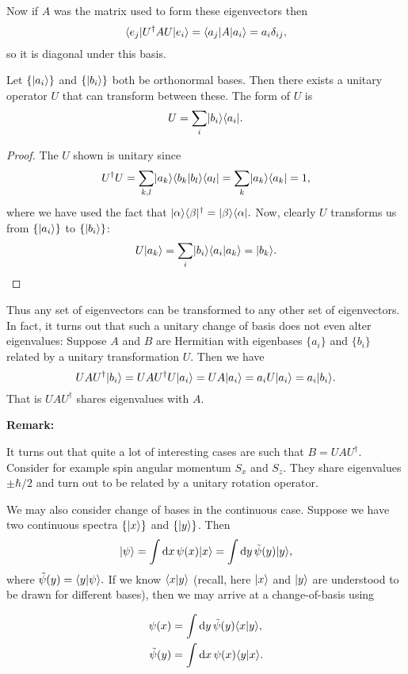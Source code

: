 Now if $A$ was the matrix used to form these eigenvectors then $$\langle e_j \rvert U^\dagger A U \lvert e_i \rangle = \langle a_j \rvert A\lvert a_i \rangle = a_i\delta_{ij},$$ so it is diagonal under this basis.

\begin{theorem}
    Let $\{\lvert a_i \rangle\}$ and $\{\lvert b_i \rangle\}$ both be orthonormal bases. Then there exists a unitary operator $U$ that can transform between these. The form of $U$ is
    $$U = \sum_i \lvert b_i \rangle\langle a_i \rvert.$$
\end{theorem}
\begin{proof}
    The $U$ shown is unitary since
    $$U^\dagger U = \sum_{k, l} \lvert a_k \rangle\langle b_k\vert b_l \rangle\langle a_l \rvert = \sum_k \lvert a_k \rangle\langle a_k \rvert = 1,$$
    where we have used the fact that $\lvert \alpha \rangle\langle \beta \rvert^\dagger = \lvert \beta \rangle\langle \alpha \rvert.$ Now, clearly $U$ transforms us from $\{\lvert a_i \rangle\}$ to $\{\lvert b_i \rangle\}$:
    $$U\lvert a_k \rangle = \sum_i \lvert b_i \rangle\langle a_i\vert a_k \rangle = \lvert b_k \rangle.$$
\end{proof}

Thus any set of eigenvectors can be transformed to any other set of eigenvectors. In fact, it turns out that such a unitary change of basis does not even alter eigenvalues: Suppose $A$ and $B$ are Hermitian with eigenbases $\{a_i\}$ and $\{b_i\}$ related by a unitary transformation $U$. Then we have
$$UAU^\dagger \lvert b_i \rangle = UAU^\dagger U \lvert a_i \rangle = UA\lvert a_i \rangle = a_i U\lvert a_i \rangle = a_i \lvert b_i \rangle.$$
That is $UAU^\dagger$ shares eigenvalues with $A$.

\medbreak
\noindent\textbf{Remark:}

It turns out that quite a lot of interesting cases are such that $B = UAU^\dagger$. Consider for example spin angular momentum $S_x$ and $S_z$. They share eigenvalues $\pm \hbar /2$ and turn out to be related by a unitary rotation operator.

We may also consider change of bases in the continuous case. Suppose we have two continuous spectra $\{\lvert x \rangle\}$ and $\{\lvert y \rangle\}$. Then
$$\lvert \psi \rangle = \int \mathrm dx\, \psi(x) \lvert x \rangle = \int \mathrm dy\, \tilde{\psi}(y) \lvert y \rangle,$$
where $\tilde{\psi}(y) = \langle y\vert\psi \rangle.$ If we know $\langle x\vert y \rangle$ (recall, here $\lvert x \rangle$ and $\lvert y \rangle$ are understood to be drawn for different bases), then we may arrive at a change-of-basis using

\begin{equation}
    \begin{aligned}
    \psi(x) &= \int \mathrm dy\,\tilde{\psi}(y) \langle x\vert y \rangle, \\ 
    \tilde\psi(y) &= \int \mathrm dx\,\psi(x) \langle y\vert x \rangle.
    \end{aligned}
    \label{eqn:wavefunction-relation}
\end{equation}
    
